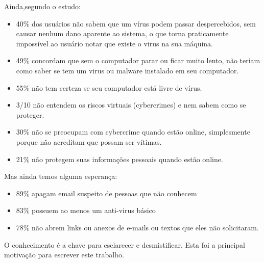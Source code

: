 Ainda,segundo o estudo:
\begin{itemize}
\item 40\% dos usuários não sabem que um vírus podem passar despercebidos, sem causar nenhum dano aparente ao sistema, o que torna praticamente impossível ao usuário notar que existe o virus na sua máquina. 
\item 49\% concordam que sem o computador parar ou ficar muito lento, não teriam como saber se tem um virus ou malware instalado em seu computador. 
\item 55\% não tem certeza se seu computador está livre de vírus.
\item 3/10 não entendem os riscos virtuais (cybercrimes) e nem sabem como se proteger.
\item 30\% não se preocupam com cybercrime quando estão online, simplesmente porque não acreditam que possam ser vítimas.
\item 21\% não protegem suas informações pessoais quando estão online.
\end{itemize}

Mas ainda temos alguma esperança:
\begin{itemize}
\item 89\% apagam email suspeito de pessoas que não conhecem
\item 83\% possuem ao menos um anti-virus básico
\item 78\% não abrem links ou anexos de e-mails ou textos que eles não solicitaram.
\end{itemize}

O conhecimento é a chave para esclarecer e desmistificar. Esta foi a principal motivação para escrever este trabalho. 
